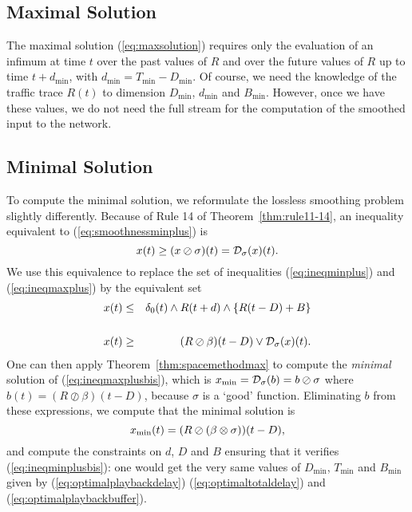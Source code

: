\subsection{Maximal Solution}

The maximal solution (\ref{eq:maxsolution}) requires only the evaluation of an infimum
at time $t$ over the past values of $R$ and over the future values of $R$ up to time $t+d_{\min}$,
with $d_{\min} = T_{\min} - D_{\min}$.  Of course, we need the knowledge of the traffic trace $R(t)$ to dimension
$D_{\min}$, $d_{\min}$ and $B_{\min}$. However, once we have these values, we do not need
the full stream for the computation of the smoothed input to the network.

\subsection{Minimal Solution}

To compute the minimal solution, we reformulate the lossless smoothing problem slightly differently. Because of Rule 14 of
Theorem~\ref{thm:rule11-14}, an inequality equivalent to (\ref{eq:smoothnessminplus}) is
\begin{equation}
\mylabel{eq:smoothnessmaxplus}
x(t) \geq (x \oslash \sigma)(t) = \calD_{\sigma}(x)(t).
\end{equation}
We use this equivalence to replace the set of inequalities (\ref{eq:ineqminplus}) and (\ref{eq:ineqmaxplus}) by the equivalent set
\begin{eqnarray}
\mylabel{eq:ineqminplusbis}
x(t) & \leq & \delta_0 (t) \wedge R(t+d)  \wedge \{R(t-D) + B \} \nonumber \\
& & \\
\mylabel{eq:ineqmaxplusbis}
x(t) & \geq & (R \oslash \beta)(t-D) \vee  \calD_{\sigma}(x)(t) .
\end{eqnarray}
One can then apply Theorem~\ref{thm:spacemethodmax} to compute the {\em minimal} solution of (\ref{eq:ineqmaxplusbis}), which is
$ x_{\min} = \mathcal D_{\sigma}(b) = b \oslash \sigma $ where 
$b(t) =(R\oslash \beta)(t-D)$,
because $\sigma$ is a `good' function. Eliminating $b$ from these expressions, we compute that the minimal solution is
\begin{equation}
\mylabel{eq:minsolution}
x_{\min}(t) = (R  \oslash (\beta \otimes \sigma))(t - D),
\end{equation}
and compute the constraints on $d$, $D$ and $B$ ensuring that it verifies (\ref{eq:ineqminplusbis}):
one would get the very same values of $D_{\min}$, $T_{\min}$ and $B_{\min}$ given by (\ref{eq:optimalplaybackdelay})
(\ref{eq:optimaltotaldelay}) and (\ref{eq:optimalplaybackbuffer}).

